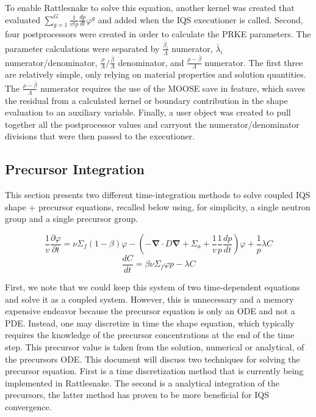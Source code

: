 \documentclass[12pt]{scrartcl}
\renewcommand{\div}{\bs{\nabla}\! \cdot \!}
\newcommand{\grad}{\bs{\nabla}}
\newcommand{\bs}[1]{\mathbf{#1}}
\newcommand{\be}{\begin{equation}}
\newcommand{\ee}{\end{equation}}
\begin{document}
To enable Rattlesnake to solve this equation, another kernel was created that evaluated $\sum_{g=1}^G\frac{1}{v^gp}\frac{dp}{dt}\varphi^g$ and added when the IQS executioner is called.  Second, four postprocessors were created in order to calculate the PRKE parameters.  The parameter calculations were separated by $\frac{\bar{\beta}_i}{\Lambda}$ numerator, $\bar{\lambda}_i$ numerator/denominator, $\frac{\rho}{\Lambda}/\frac{\bar{\beta}}{\Lambda}$ denominator, and $\frac{\rho-\bar{\beta}}{\Lambda}$ numerator.  The first three are relatively simple, only relying on material properties and solution quantities.  The $\frac{\rho-\bar{\beta}}{\Lambda}$ numerator requires the use of the MOOSE save in feature, which saves the residual from a calculated kernel or boundary contribution in the shape evaluation to an auxiliary variable.  Finally, a user object was created to pull together all the postprocessor values and carryout the numerator/denominator divisions that were then passed to the executioner.


\subsection{Precursor Integration}
This section presents two different time-integration methods to solve coupled IQS shape + precursor equations, recalled below
using, for simplicity, a single neutron group and a single precursor group.

\be
\frac{1}{v}\frac{\partial\varphi}{\partial t}=\nu\Sigma_f(1-\beta)\varphi-\left(-\div D \grad + \Sigma_a + \frac{1}{v}\frac{1}{p}\frac{dp}{dt}\right)\varphi+\frac{1}{p}\lambda C 
\ee
\be
\frac{dC}{dt} = \beta\nu \Sigma_f \varphi p - \lambda C
\ee

First, we note that we could keep this system of two time-dependent equations and solve it as a coupled system. 
However, this is unnecessary and a memory expensive endeavor because the precursor equation is only an ODE and not a PDE. 
Instead, one may discretize in time the shape equation, which typically requires the knowledge of the
precursor concentrations at the end of the time step. This precursor value is taken from the solution, numerical or analytical,
of the precursors ODE. This document will discuss two techniques for solving the precursor equation.  First is a time discretization method that is currently being implemented in Rattlesnake.  The second is a analytical integration of the precursors, the latter method has proven to be more beneficial for IQS convergence.
\end{document}
